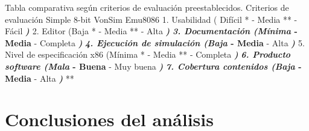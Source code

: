 \documentclass[12pt,twoside]{templates/unerthesis}
\begin{document}
Tabla comparativa según criterios de evaluación preestablecidos.
Criterios de evaluación
Simple 8-bit
VonSim
Emu8086
1. Usabilidad
( Difícil * - Media ** - Fácil \emph{\textbf{)
}
\textbf{
}}
2. Editor
(Baja * - Media ** - Alta \textbf{\emph{)
}
}
\textbf{\emph{
3. Documentación
(Mínima } - Media } - Completa \textbf{\emph{)
}
}
\textbf{\emph{
4. Ejecución de simulación
(Baja } - Media } - Alta \emph{\textbf{)
}
\textbf{
}}
5. Nivel de especificación x86 (Mínima * - Media ** - Completa \textbf{\emph{)
}
}
\textbf{\emph{
6. Producto software (Mala } - Buena } - Muy buena \emph{\textbf{)
}
}\textbf{
\emph{
7. Cobertura contenidos
(Baja } - Media } - Alta \textbf{\emph{)
}
}
**

\hypertarget{conclusiones-del-anuxe1lisis}{%
\section{Conclusiones del análisis}\label{conclusiones-del-anuxe1lisis}}
\end{document}

